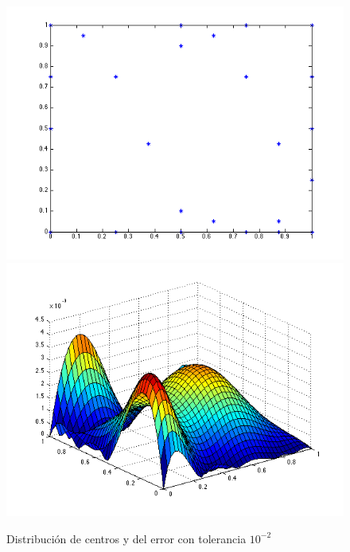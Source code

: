\documentclass[11pt,a4paper]{article}
\begin{document}
\begin{figure}[H]
\begin{center}
\includegraphics[scale=.4]{edp1_tol2.png}
\includegraphics[scale=.4]{error_edp1_tol2.png}
\caption{Distribución de centros y del error con tolerancia $10^{-2}$}
\end{center}
\end{figure}
\end{document}

